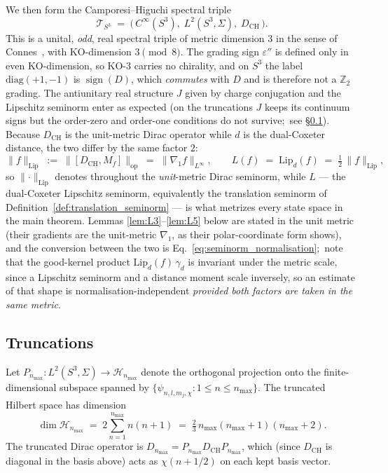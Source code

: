 \documentclass[11pt,a4paper]{article}
\theoremstyle{plain}
\theoremstyle{definition}
\newcommand{\nmax}{n_{\max}}
\newcommand{\sthree}{S^{3}}
\newcommand{\Hilb}{\mathcal{H}}
\newcommand{\Tcal}{\mathcal{T}}
\newcommand{\opnorm}[1]{\lVert #1 \rVert_{\mathrm{op}}}
\newcommand{\Lipnorm}[1]{\lVert #1 \rVert_{\mathrm{Lip}}}
\newcommand{\norm}[1]{\lVert #1 \rVert}
\newcommand{\Mat}{M}
\newcommand{\DCH}{D_{\mathrm{CH}}}
\begin{document}
We then form the Camporesi--Higuchi spectral triple
\begin{equation}
\Tcal_{\sthree}
\;=\; \bigl(\, C^\infty(\sthree),\; L^2(\sthree, \Sigma),\; \DCH \,\bigr).
\end{equation}
This is a unital, \emph{odd}, real spectral triple of metric
dimension $3$ in the sense of Connes~\cite{connes1995}, with KO-dimension
$3 \pmod 8$.  The grading sign $\varepsilon''$ is
defined only in even KO-dimension, so KO-$3$ carries no chirality, and on
$\sthree$ the label $\mathrm{diag}(+1,-1)$ is $\operatorname{sign}(D)$, which
\emph{commutes} with $D$ and is therefore not a $\mathbb{Z}_2$ grading.
The antiunitary real
structure $J$ given by charge conjugation and the Lipschitz seminorm enter as
expected (on the truncations $J$ keeps its continuum signs but the
order-zero and order-one conditions do not survive;\ see
\S\ref{sec:truncations}).  Because
$\DCH$ is the unit-metric Dirac operator while $d$ is the dual-Coxeter
distance, the two differ by the same factor $2$:
\begin{equation}\label{eq:seminorm_normalisation}
   \Lipnorm{f} \;:=\; \opnorm{[\DCH, \Mat_f]} \;=\; \norm{\nabla_1 f}_{L^\infty},
   \qquad
   L(f) \;=\; \mathrm{Lip}_d(f) \;=\; \tfrac{1}{2}\,\Lipnorm{f},
\end{equation}
so $\Lipnorm{\cdot}$ denotes throughout the \emph{unit}-metric Dirac
seminorm, while $L$ --- the dual-Coxeter Lipschitz seminorm, equivalently
the translation seminorm of Definition~\ref{def:translation_seminorm} ---
is what metrizes every state space in the main theorem.  Lemmas
\ref{lem:L3}--\ref{lem:L5} below are stated in the unit metric (their
gradients are the unit-metric $\nabla_1$, as their polar-coordinate form
shows), and the conversion between the two is
Eq.~\eqref{eq:seminorm_normalisation};\ note that the good-kernel product
$\mathrm{Lip}_d(f)\,\gamma_d$ is invariant under the metric scale, since a
Lipschitz seminorm and a distance moment scale inversely, so an estimate
of that shape is normalisation-independent \emph{provided both factors are
taken in the same metric}.

\subsection{Truncations}\label{sec:truncations}

Let $P_{\nmax}: L^2(\sthree, \Sigma) \to \Hilb_{\nmax}$ denote the
orthogonal projection onto the finite-dimensional subspace spanned by
$\{\psi_{n, l, m_j, \chi} : 1 \le n \le \nmax\}$. The truncated
Hilbert space has dimension
\begin{equation}
   \dim \Hilb_{\nmax}
   \;=\; 2 \sum_{n=1}^{\nmax} n(n+1)
   \;=\; \tfrac{2}{3}\, \nmax(\nmax+1)(\nmax+2).
\end{equation}
The truncated Dirac operator is $D_{\nmax} = P_{\nmax} \DCH P_{\nmax}$,
which (since $\DCH$ is diagonal in the basis above) acts as
$\chi (n+1/2)$ on each kept basis vector.
\end{document}
